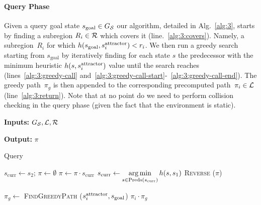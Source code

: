 \documentclass[a4paper,10pt]{article}
\begin{document}
\paragraph{Query Phase}
Given a query goal state $s_{\text{goal}} \in G_\mathcal{S}$ 
our algorithm, detailed in Alg.~\ref{alg:3}, starts by finding a subregion $R_i \in \mathcal{R}$ which covers it (line.~\ref{alg:3:covers}). Namely, a subregion~$R_i$ for which 
$h(s_{\text{goal}}, s^{\text{attractor}}_i) < r_i$.
We then run a greedy search starting from $s_{\text{goal}}$ by iteratively finding for each state $s$ the predecessor with the minimum heuristic $h(s, s^{\text{attractor}}_i)$ value until the search reaches \sAttract (lines~\ref{alg:3:greedy-call} and~\ref{alg:3:greedy-call-start}-~\ref{alg:3:greedy-call-end}). 
The greedy path~$\pi_g$ is then appended to the corresponding precomputed path~$\pi_i \in \mathcal{L}$ (line~\ref{alg:3:return}). 
Note that at no point  do we need to perform collision checking in the query phase (given the fact that the environment is static).

\begin{algorithm}[t]
\hspace*{\algorithmicindent} \textbf{Inputs:} $G_\mathcal{S}, \mathcal{L}, \mathcal{R}$

\hspace*{\algorithmicindent} \textbf{Output:} $\pi$	
\caption{Query}\label{alg:3}

\begin{algorithmic}[1]
  \label{alg:3:greedy-call-start}
  \State $s_{\text{curr}} \leftarrow s_2$; \hspace{2mm} $\pi \leftarrow \emptyset$
    \State $\pi \leftarrow \pi \cdot s_{\text{curr}}$
      \State $s_{\text{curr}} \leftarrow \operatorname*{arg\,min}\limits_{s \in \text{Preds}(s_{\text{curr}})} h(s, s_1)$  
    \EndWhile
    \State \Return \textsc{Reverse} ($\pi$)   
\EndProcedure
\label{alg:3:greedy-call-end}

\vspace{2mm}

    \label{alg:3:covers}
      \State $\pi_g \leftarrow$ \textsc{FindGreedyPath} ($s^{\text{attractor}}_i, s_{\text{goal}}$)
      \label{alg:3:greedy-call}
      \State \Return $\pi_i \cdot \pi_g$  
      \label{alg:3:return}
    \EndIf
  \EndFor

\EndProcedure
\end{algorithmic}
\end{algorithm}
\end{document}
